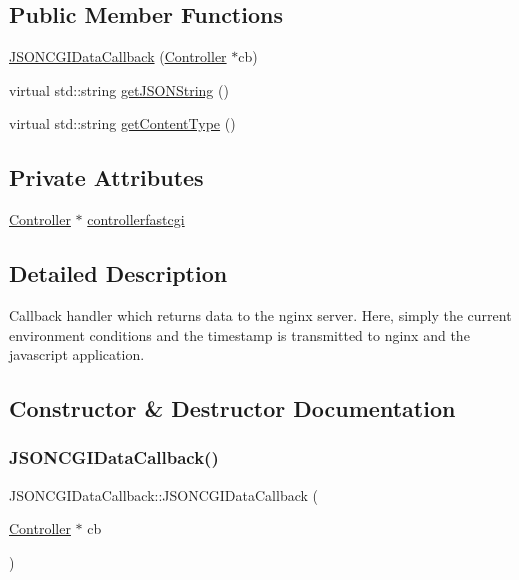 \subsection*{Public Member Functions}
\begin{DoxyCompactItemize}
\item 
\hyperlink{classJSONCGIDataCallback_a8b3bd7f1223a5f62a25c57651b5462bb}{J\+S\+O\+N\+C\+G\+I\+Data\+Callback} (\hyperlink{classController}{Controller} $\ast$cb)
\item 
virtual std\+::string \hyperlink{classJSONCGIDataCallback_a3ca67affb4f88f8c5a1f7f04b4bbc0ef}{get\+J\+S\+O\+N\+String} ()
\item 
virtual std\+::string \hyperlink{classJSONCGIHandler_1_1GETCallback_a4e1fee495ddeb4e24eaa5b8e767ea838}{get\+Content\+Type} ()
\end{DoxyCompactItemize}
\subsection*{Private Attributes}
\begin{DoxyCompactItemize}
\item 
\hyperlink{classController}{Controller} $\ast$ \hyperlink{classJSONCGIDataCallback_ac8684fae755ea1ba8e939e7fbed09c99}{controllerfastcgi}
\end{DoxyCompactItemize}


\subsection{Detailed Description}
Callback handler which returns data to the nginx server. Here, simply the current environment conditions and the timestamp is transmitted to nginx and the javascript application. 

\subsection{Constructor \& Destructor Documentation}
\mbox{\label{classJSONCGIDataCallback_a8b3bd7f1223a5f62a25c57651b5462bb}} 
\subsubsection{\texorpdfstring{J\+S\+O\+N\+C\+G\+I\+Data\+Callback()}{JSONCGIDataCallback()}}
{\footnotesize\ttfamily J\+S\+O\+N\+C\+G\+I\+Data\+Callback\+::\+J\+S\+O\+N\+C\+G\+I\+Data\+Callback (\begin{DoxyParamCaption}\item[{\hyperlink{classController}{Controller} $\ast$}]{cb }\end{DoxyParamCaption})\hspace{0.3cm}{\ttfamily [inline]}}

